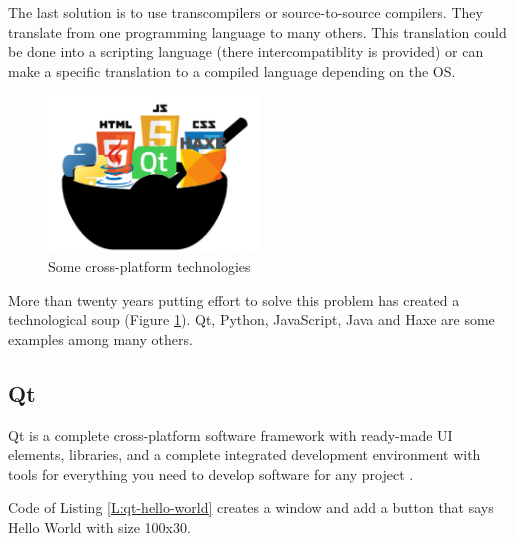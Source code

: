 The last solution is to use transcompilers or source-to-source compilers.
They translate from one programming language to many others. This translation
could be done into a scripting language (there intercompatiblity is provided) or
can make a specific translation to a compiled language depending on the OS.

\begin{figure}[htb]
	\begin{center}
		\includegraphics[width=0.5\textwidth]{./figures/techsoup.png}
		\caption{Some cross-platform technologies}
		\label{F:tech-soup}
	\end{center}
\end{figure}


More than twenty years putting effort to solve this problem has created a 
technological soup (Figure \ref{F:tech-soup}). Qt, Python, JavaScript, Java and 
Haxe
\cite{qt-web}\cite{py-web}\cite{js-wiki}\cite{what-is-java}\cite{what-is-haxe}
are some examples among many others.


\subsection{Qt}

Qt is a complete cross-platform software framework with ready-made UI elements,
\CC libraries, and a complete integrated development environment with tools for 
everything you need to develop software for any project \cite{qt-web}.

\begin{codefigure}
\end{codefigure}

Code of Listing \ref{L:qt-hello-world} creates a window and add a button that
says Hello World with size 100x30.

